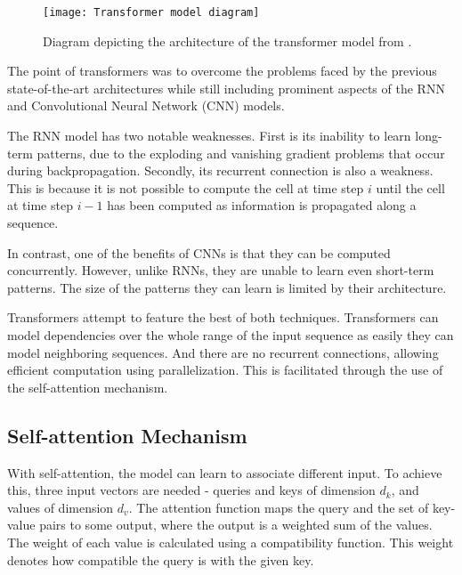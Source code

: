 \begin{figure}[h]
\centering
\texttt{[image: Transformer model diagram]}
\caption{Diagram depicting the architecture of the transformer model from \citet{AttentionIsAllYouNeed}.}
\label{fig:original transformer}
\end{figure}
The point of transformers was to overcome the problems faced by the previous state-of-the-art architectures while still including prominent aspects of the RNN and Convolutional Neural Network (CNN) models.

The RNN model has two notable weaknesses. First is its inability to learn long-term patterns, due to the exploding and vanishing gradient problems that occur during backpropagation.
Secondly, its recurrent connection is also a weakness. This is because it is not possible to compute the cell at time step $i$ until the cell at time step $i-1$ has been computed as information is propagated along a sequence.

In contrast, one of the benefits of CNNs is that they can be computed concurrently. However, unlike RNNs, they are unable to learn even short-term patterns. The size of the patterns they can learn is limited by their architecture.

Transformers attempt to feature the best of both techniques.
Transformers can model dependencies over the whole range of the input sequence as easily they can model neighboring sequences. And there are no recurrent connections, allowing efficient computation using parallelization. This is facilitated through the use of the self-attention mechanism.\cite{TransformersScratchPeterbloem}

 
\subsection{Self-attention Mechanism}


With self-attention, the model can learn to associate different input.
To achieve this, three input vectors are needed - queries and keys of dimension $d_k$, and values of dimension $d_v$.
The attention function maps the query and the set of key-value pairs to some output, where the output is a weighted sum of the values.
The weight of each value is calculated using a compatibility function.
This weight denotes how compatible the query is with the given key.



